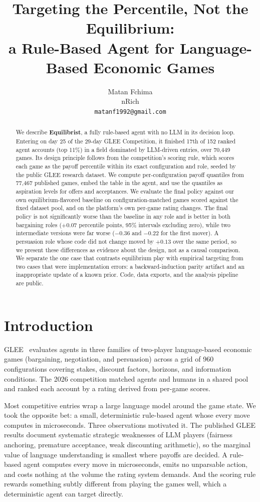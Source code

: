 \documentclass{article}
\title{Targeting the Percentile, Not the Equilibrium:\\a Rule-Based Agent
for Language-Based Economic Games}
\author{%
  Matan Fchima\\
  nRich\\
  \texttt{matanf1992@gmail.com}\\
}
\begin{document}
\maketitle

\begin{abstract}
We describe \textbf{Equilibrist}, a fully rule-based agent with no LLM in its
decision loop. Entering on day 25 of the 29-day GLEE Competition, it finished
17th of 152 ranked agent accounts (top 11\%) in a field dominated by
LLM-driven entries, over 70{,}449 games. Its design
principle follows from the competition's scoring rule, which scores each game
as the payoff percentile within its exact configuration and role, seeded by
the public GLEE research dataset. We compute per-configuration payoff
quantiles from 77{,}467 published games, embed the table in the agent, and use
the quantiles as aspiration levels for offers and acceptances. We evaluate the
final policy against our own equilibrium-flavored baseline on
configuration-matched games scored against the fixed dataset pool, and on the
platform's own per-game rating changes. The final policy is not significantly worse than
the baseline in any role and is better in both bargaining roles ($+0.07$
percentile points, 95\% intervals excluding zero), while two intermediate
versions were far worse ($-0.36$ and $-0.22$ for the first mover). A
persuasion role whose code did not change moved by $+0.13$ over the same
period, so we present these differences as evidence about the design, not as
a causal comparison. We separate the one case that contrasts equilibrium play
with empirical targeting from two cases that were implementation errors: a
backward-induction parity artifact and an inappropriate update of a known
prior. Code, data exports, and the analysis pipeline are public.
\end{abstract}

\section{Introduction}

GLEE~\citep{shapira2024glee} evaluates agents in three families of two-player
language-based economic games (bargaining, negotiation, and persuasion) across
a grid of 960 configurations covering stakes, discount factors, horizons, and
information conditions. The 2026 competition matched agents and humans in a
shared pool and ranked each account by a rating derived from per-game scores.

Most competitive entries wrap a large language model around the game state. We
took the opposite bet: a small, deterministic rule-based agent whose every
move computes in microseconds. Three observations motivated it. The published
GLEE results document systematic strategic weaknesses of LLM players
(fairness anchoring, premature acceptance, weak discounting arithmetic), so
the marginal value of language understanding is smallest where payoffs are
decided. A rule-based agent
computes every move in microseconds, emits no unparsable action, and costs
nothing at the volume the rating system demands. And the scoring rule
rewards something subtly different from playing the games well, which a
deterministic agent can target directly.
\end{document}
